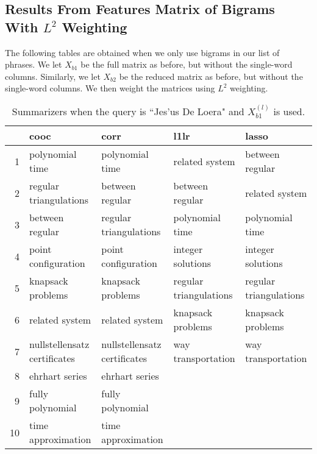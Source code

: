 \documentclass{article}
\begin{document}
\subsection{Results From Features Matrix of Bigrams With $L^2$ Weighting}
The following tables are obtained when we only use bigrams in our list of phrases. We let $X_{b1}$ be the full matrix as before, but without the single-word columns. Similarly, we let $X_{b2}$ be the reduced matrix as before, but without the single-word columns. We then weight the matrices using $L^2$ weighting.

\begin{table}[H]
\begin{center}
\begin{tabular}{|r|llll|}
 \hline
& cooc & corr & l1lr & lasso \\
 \hline
1 & polynomial time & polynomial time & related system & between regular \\
 2 & regular triangulations & between regular & between regular & related system \\
 3 & between regular & regular triangulations & polynomial time & polynomial time \\
 4 & point configuration & point configuration & integer solutions & integer solutions \\
 5 & knapsack problems & knapsack problems & regular triangulations & regular triangulations \\
 6 & related system & related system & knapsack problems & knapsack problems \\
 7 & nullstellensatz certificates & nullstellensatz certificates & way transportation & way transportation \\
 8 & ehrhart series & ehrhart series & & \\
 9 & fully polynomial & fully polynomial & & \\
 10 & time approximation & time approximation & & \\
 \hline
\end{tabular}
\end{center}
\caption{Summarizers when the query is ``Jes\a'us De Loera" and $X_{b1}^{(l)}$ is used.}
\end{table}
\end{document}
